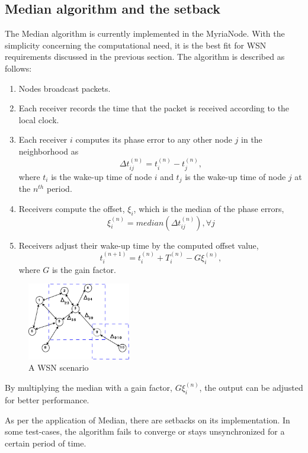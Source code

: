 \documentclass[journal]{IEEEtran}
\begin{document}
\subsection{\textbf{Median algorithm and the setback}}
\par The Median algorithm is currently implemented in the MyriaNode. With the simplicity concerning
 the computational need, it is the best fit for WSN requirements discussed in the previous section.
The algorithm is described as follows:
\begin{enumerate}
\item Nodes broadcast packets.
\item Each receiver records the time that the packet is received according to the local clock.
\item Each receiver $i$ computes its phase error to any other node $j$ in the neighborhood as
\begin{equation}
\Delta t_{ij}^{(n)} = t_i^{(n)} - t_j^{(n)} ,\label{err}
\end{equation}
where $t_i$ is the wake-up time of node $i$ and $t_j$ is the wake-up
time of node $j$ at the $n^{th}$ period.
\item Receivers compute the offset, $\xi_i$, which is the median of the phase errors,
\begin{equation}
\xi_i^{(n)} = median(\Delta t_{ij}^{(n)}) , \forall j
\end{equation}
\item Receivers adjust their wake-up time by the computed offset value,
\begin{equation}
t_{i}^{(n+1)} = t_i^{(n)} + T_i^{(n)} - G\xi_i^{(n)},
\end{equation}
where $G$ is the gain factor.
\end{enumerate}
\begin{figure}[b]
\centering
\includegraphics[width=0.4\textwidth]{node_field}
\caption{A WSN scenario} \label{wsn}
\end{figure}
By multiplying the median with a gain factor, $G\xi_i^{(n)}$, the output can be adjusted for better performance.
\par As per the application of Median, there are setbacks on its implementation. In some test-cases, the algorithm fails to converge or stays unsynchronized for a certain period of time.
\end{document}
